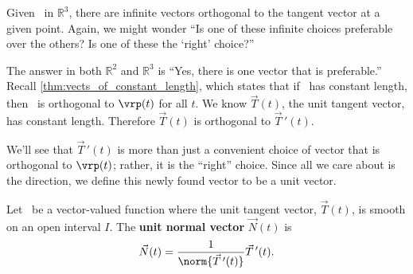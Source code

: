 
Given \vrt\ in $\mathbb{R}^3$,  there are infinite vectors orthogonal to the tangent vector at a given point. Again, we might wonder ``Is one of these infinite choices preferable over the others? Is one of these the `right' choice?''

The answer in both $\mathbb{R}^2$ and $\mathbb{R}^3$ is ``Yes, there is one vector that is preferable.'' %
Recall \autoref{thm:vects_of_constant_length}, which states that if \vrt\ has constant length, then \vrt\ is orthogonal to $\vrp(t)$ for all $t$. We know $\vec T(t)$, the unit tangent vector, has constant length. Therefore $\vec T(t)$ is orthogonal to $\vec T\,'(t)$.

We'll see that $\vec T\,'(t)$ is more than just a convenient choice of vector that is orthogonal to $\vrp(t)$; rather, it is the ``right'' choice. Since all we care about is the direction, we define this newly found vector to be a unit vector.

{Let \vrt\ be a vector-valued function where the unit tangent vector, $\vec T(t)$, is smooth on an open interval $I$. The \textbf{unit normal vector} $\vec N(t)$ is
\[\vec N(t) = \frac1{\norm{\vec T\,'(t)}}\vec T\,'(t).\]}

